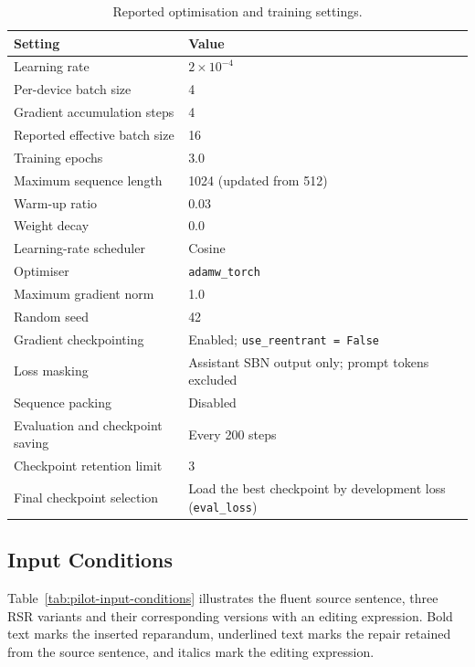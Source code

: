 \begin{table}[htbp]
\centering
\small
\begin{tabular}{@{}p{}p{}@{}}
\toprule
Setting & Value \\
\midrule
Learning rate & $2\times10^{-4}$ \\
Per-device batch size & 4 \\
Gradient accumulation steps & 4 \\
Reported effective batch size & 16 \\
Training epochs & 3.0 \\
Maximum sequence length & 1024 (updated from 512) \\
Warm-up ratio & 0.03 \\
Weight decay & 0.0 \\
Learning-rate scheduler & Cosine \\
Optimiser & \texttt{adamw\_torch} \\
Maximum gradient norm & 1.0 \\
Random seed & 42 \\
Gradient checkpointing & Enabled; \texttt{use\_reentrant = False} \\
Loss masking & Assistant SBN output only; prompt tokens excluded \\
Sequence packing & Disabled \\
Evaluation and checkpoint saving & Every 200 steps \\
Checkpoint retention limit & 3 \\
Final checkpoint selection & Load the best checkpoint by development loss
  (\texttt{eval\_loss}) \\
\bottomrule
\end{tabular}
\caption{Reported optimisation and training settings.}
\label{tab:pilot-optimisation}
\end{table}

\subsection{Input Conditions}

Table~\ref{tab:pilot-input-conditions} illustrates the fluent source sentence, three RSR
variants and their corresponding versions with an editing expression. Bold text
marks the inserted reparandum, underlined text marks the repair retained from
the source sentence, and italics mark the editing expression.

